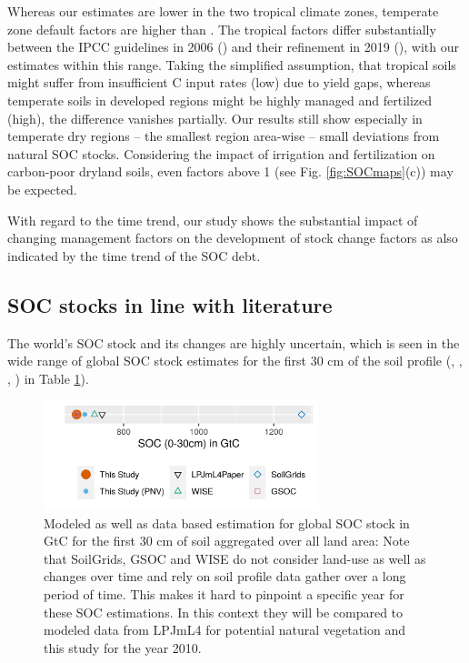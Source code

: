 \documentclass[gc, manuscript]{copernicus}
\begin{document}
Whereas our estimates are lower in the two tropical climate zones, temperate zone default factors are higher than \citep{calvo_buendia_ipcc_2019}. The tropical factors differ substantially between the IPCC guidelines in 2006 (\citep{eggleston_ipcc_2006}) and their refinement in 2019 (\citep{calvo_buendia_ipcc_2019}), with our estimates within this range.
Taking the simplified assumption, that tropical soils might suffer from insufficient C input rates (low) due to yield gaps, whereas temperate soils in developed regions might be highly managed and fertilized (high), the difference vanishes partially. Our results still show especially in temperate dry regions -- the smallest region area-wise -- small deviations from natural SOC stocks. Considering the impact of irrigation and fertilization on carbon-poor dryland soils, even factors above 1 (see Fig. \ref{fig:SOCmaps}(c)) may be expected.

With regard to the time trend, our study shows the substantial impact of changing management factors on the development of stock change factors as also indicated by the time trend of the SOC debt.

\hypertarget{soc-stocks-in-line-with-literature}{%
\subsection{SOC stocks in line with literature}\label{soc-stocks-in-line-with-literature}}

The world's SOC stock and its changes are highly uncertain, which is seen in the wide range of global SOC stock estimates for the first 30 cm of the soil profile (\citep{batjes_harmonized_2016}, \citep{hengl_soilgrids250m_2017}, \citep{fao_global_2018}, \citep{schaphoff_lpjml4_2018-1}) in Table \ref{fig:SOCglo}).

\begin{figure}[h]
\includegraphics[width=8cm]{../ResultNotebooks/Output/Images/glo_comparisonfigure} \caption{Modeled as well as data based estimation for global SOC stock in GtC for the first 30 cm of soil aggregated over all land area: Note that SoilGrids, GSOC and WISE do not consider land-use as well as changes over time and rely on soil profile data gather over a long period of time. This makes it hard to pinpoint a specific year for these SOC estimations. In this context they will be compared to modeled data from LPJmL4 for potential natural vegetation and this study for the year 2010.}\label{fig:SOCglo}
\end{figure}
\end{document}
